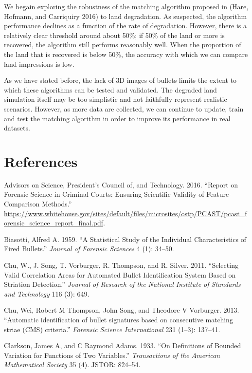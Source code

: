 \documentclass[12pt,]{article}
\theoremstyle{definition}
\theoremstyle{definition}
\theoremstyle{definition}
\theoremstyle{remark}
\begin{document}
We begain exploring the robustness of the matching algorithm proposed in
(Hare, Hofmann, and Carriquiry 2016) to land degradation. As suspected,
the algorithm performance declines as a function of the rate of
degradation. However, there is a relatively clear threshold around about
50\%; if 50\% of the land or more is recovered, the algorithm still
performs reasonably well. When the proportion of the land that is
recovered is below 50\%, the accuracy with which we can compare land
impressions is low.

As we have stated before, the lack of 3D images of bullets limits the
extent to which these algorithms can be tested and validated. The
degraded land simulation itself may be too simplistic and not faithfully
represent realistic scenarios. However, as more data are collected, we
can continue to update, train and test the matching algorithm in order
to improve its performance in real datasets.

\clearpage

\section*{References}\label{references}

\hypertarget{refs}{}
\hypertarget{ref-pcast2016}{}
Advisors on Science, President's Council of, and Technology. 2016.
``Report on Forensic Science in Criminal Courts: Ensuring Scientific
Validity of Feature-Comparison Methods.''
\url{https://www.whitehouse.gov/sites/default/files/microsites/ostp/PCAST/pcast_forensic_science_report_final.pdf}.

\hypertarget{ref-biasotti:1959}{}
Biasotti, Alfred A. 1959. ``A Statistical Study of the Individual
Characteristics of Fired Bullets.'' \emph{Journal of Forensic Sciences}
4 (1): 34--50.

\hypertarget{ref-chu:2011}{}
Chu, W., J. Song, T. Vorburger, R. Thompson, and R. Silver. 2011.
``Selecting Valid Correlation Areas for Automated Bullet Identification
System Based on Striation Detection.'' \emph{Journal of Research of the
National Institute of Standards and Technology} 116 (3): 649.

\hypertarget{ref-thompson:2013}{}
Chu, Wei, Robert M Thompson, John Song, and Theodore V Vorburger. 2013.
``Automatic identification of bullet signatures based on consecutive
matching striae (CMS) criteria.'' \emph{Forensic Science International}
231 (1--3): 137--41.

\hypertarget{ref-clarkson1933definitions}{}
Clarkson, James A, and C Raymond Adams. 1933. ``On Definitions of
Bounded Variation for Functions of Two Variables.'' \emph{Transactions
of the American Mathematical Society} 35 (4). JSTOR: 824--54.
\end{document}
